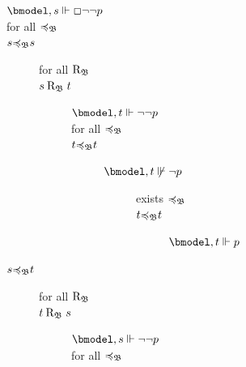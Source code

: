 \begin{example}
\begin{figure}
\begin{center}
{{\begin{minipage}[t]{.55\textwidth}
\begin{description}
                        \item[$\bforces s {\Box\lnot\lnot p}$]
                        \item[for all ${\preccurlyeq_{\mathfrak{B}}}$] \hfil
                        \item[$s {\preccurlyeq_{\mathfrak{B}}} s$] \hfil
                        \begin{description}
                                \item[for all $\mathbin{\mathrm{R}_{\mathfrak{B}_{}}}$]
                                \item[$s \mathbin{\mathrm{R}_{\mathfrak{B}_{}}} t$]\hfil
                                \begin{description}
                                \item[$\bforces t {\lnot\lnot p}$]
                                \item[for all ${\preccurlyeq_{\mathfrak{B}}}$]
                                \item[$t {\preccurlyeq_{\mathfrak{B}}} t$]\hfil
                                \begin{description}
                                        \item[$\nbforces t {\lnot p}$] \hfil
                                        \begin{description}
                                        \item[exists ${\preccurlyeq_{\mathfrak{B}}}$]
                                        \item[$t {\preccurlyeq_{\mathfrak{B}}} t$] \hfil
                                        \item[\quad] $\bforces t p$
                                        \end{description}
                                \end{description}
                                \end{description}
                        \end{description}

                        \item[$s {\preccurlyeq_{\mathfrak{B}}} t$]\hfil
                        \begin{description}
                                \item[for all $\mathbin{\mathrm{R}_{\mathfrak{B}_{}}}$]
                                \item[$t \mathbin{\mathrm{R}_{\mathfrak{B}_{}}} s$]\hfil
                                \begin{description}
                                \item[$\bforces s {\lnot\lnot p}$]
                                \item[for all ${\preccurlyeq_{\mathfrak{B}}}$]
                                

\end{description}
\end{description}
\end{description}
\end{minipage}}}
\end{center}
\end{figure}
\end{example}

